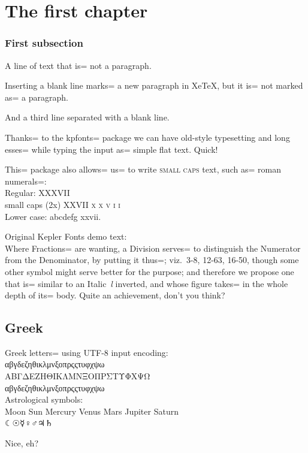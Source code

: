 \documentclass{book}
\begin{document}
\chapter{The first chapter}

\subsection{First subsection}




A line of text that is= not a paragraph.

Inserting a blank line marks= a new paragraph in XeTeX, but it is= not marked
as= a paragraph.

And a third line separated with a blank line.

Thanks= to the kpfonts= package we can have old-style typesetting and
long esses= while typing the input as= simple flat text. Quick!

This= package also allows= us= to write \textsc{small caps} text, such as=
roman numerals=:\\
Regular:	XXXVII\\
small caps (2x) \textsc{XXVII x x v i i}\\
Lower case: abcdefg xxvii.

Original Kepler Fonts demo text:\\
Where Fractions= are wanting, a Division serves= to distinguish the
Numerator from the Denominator, by putting it thus=; viz.\ 3-8, 12-63, 
16-50, though some other symbol might serve better for the purpose; and
therefore we propose one that is= similar to an Italic~\textit{l}
inverted, and whose figure takes= in the whole depth of its= body.
Quite an achievement, don't you think?

\section{Greek}
Greek letters= using UTF-8 input encoding:\\
αβγδεζηθικλμνξοπρςςτυφχψω\\
ΑΒΓΔΕΖΗΘΙΚΛΜΝΞΟΠΡΣΤΥΦΧΨΩ\\
αβγδεζηθικλμνξοπρςςτυφχψω\\

Astrological symbols:\\
Moon Sun Mercury Venus Mars Jupiter Saturn\\
☾☉☿♀♂♃♄

Nice, eh?

\end{document}
